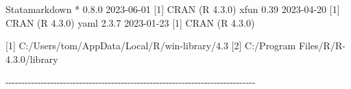 \documentclass[
  10pt,
  a4paper,
]{book}
\newenvironment{Shaded}{\begin{snugshade}}{\end{snugshade}}
\newcommand{\DecValTok}[1]{\textcolor[rgb]{0.68,0.00,0.00}{#1}}
\newcommand{\ErrorTok}[1]{\textcolor[rgb]{0.68,0.00,0.00}{#1}}
\newcommand{\FloatTok}[1]{\textcolor[rgb]{0.68,0.00,0.00}{#1}}
\newcommand{\FunctionTok}[1]{\textcolor[rgb]{0.28,0.35,0.67}{#1}}
\newcommand{\NormalTok}[1]{\textcolor[rgb]{0.00,0.46,0.62}{#1}}
\newcommand{\SpecialCharTok}[1]{\textcolor[rgb]{0.37,0.37,0.37}{#1}}
\begin{document}
\begin{Shaded}
\begin{Highlighting}[]
\NormalTok{ Statamarkdown }\SpecialCharTok{*} \DecValTok{0}\NormalTok{.}\FloatTok{8.0}   \DecValTok{2023{-}06{-}01}\NormalTok{ [}\DecValTok{1}\NormalTok{] }\FunctionTok{CRAN}\NormalTok{ (R }\DecValTok{4}\NormalTok{.}\FloatTok{3.0}\NormalTok{)}
\NormalTok{ xfun            }\FloatTok{0.39}    \DecValTok{2023{-}04{-}20}\NormalTok{ [}\DecValTok{1}\NormalTok{] }\FunctionTok{CRAN}\NormalTok{ (R }\DecValTok{4}\NormalTok{.}\FloatTok{3.0}\NormalTok{)}
\NormalTok{ yaml            }\DecValTok{2}\NormalTok{.}\FloatTok{3.7}   \DecValTok{2023{-}01{-}23}\NormalTok{ [}\DecValTok{1}\NormalTok{] }\FunctionTok{CRAN}\NormalTok{ (R }\DecValTok{4}\NormalTok{.}\FloatTok{3.0}\NormalTok{)}

\NormalTok{ [}\DecValTok{1}\NormalTok{] C}\SpecialCharTok{:}\ErrorTok{/}\NormalTok{Users}\SpecialCharTok{/}\NormalTok{tom}\SpecialCharTok{/}\NormalTok{AppData}\SpecialCharTok{/}\NormalTok{Local}\SpecialCharTok{/}\NormalTok{R}\SpecialCharTok{/}\NormalTok{win}\SpecialCharTok{{-}}\NormalTok{library}\SpecialCharTok{/}\FloatTok{4.3}
\NormalTok{ [}\DecValTok{2}\NormalTok{] C}\SpecialCharTok{:}\ErrorTok{/}\NormalTok{Program Files}\SpecialCharTok{/}\NormalTok{R}\SpecialCharTok{/}\NormalTok{R}\DecValTok{{-}4}\NormalTok{.}\FloatTok{3.0}\SpecialCharTok{/}\NormalTok{library}

\SpecialCharTok{{-}{-}{-}{-}{-}{-}{-}{-}{-}{-}{-}{-}{-}{-}{-}{-}{-}{-}{-}{-}{-}{-}{-}{-}{-}{-}{-}{-}{-}{-}{-}{-}{-}{-}{-}{-}{-}{-}{-}{-}{-}{-}{-}{-}{-}{-}{-}{-}{-}{-}{-}{-}{-}{-}{-}{-}{-}{-}{-}{-}{-}{-}{-}{-}{-}{-}{-}{-}{-}{-}{-}{-}{-}{-}{-}{-}{-}{-}}
\end{Highlighting}
\end{Shaded}


  

\backmatter
\end{document}

